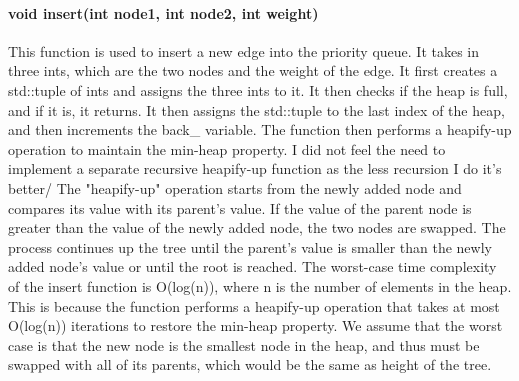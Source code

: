			\paragraph{{\color{orange}void} {\color{draculapurple}insert}({\color{orange}int} node1, {\color{orange}int} node2, {\color{orange}int} weight)}
				This function is used to insert a new edge into the priority queue. It takes in three {\color{orange}int}s, 
				which are the two nodes and the weight of the edge. It first creates a {\color{draculapurple}std::tuple} of 
				{\color{draculapurple}int}s and assigns the three {\color{orange}int}s to it. It then checks if the heap is full, 
				and if it is, it returns. It then assigns the {\color{draculapurple}std::tuple} to the last index of the heap, 
				and then increments the {\color{Turquoise}back\_} variable.
				The function then performs a {\color{draculapurple}heapify-up} operation to maintain the min-heap property. I did not feel the need to implement a separate recursive heapify-up function as the less recursion I do it's better/
				The "{\color{draculapurple}heapify-up}" operation starts from the newly added node and compares its value with its parent's value. 
				If the value of the parent node is greater than the value of the newly added node, the two nodes are swapped.
				The process continues up the tree until the parent's value is smaller than the newly added node's value or until the root is reached.
				The worst-case time complexity of the {\color{draculapurple}insert} function is {\color{lightblue}O(log(n))}, where n is the number of elements in the heap.
				This is because the function performs a {\color{draculapurple}heapify-up} operation that takes at most {\color{lightblue}O(log(n))} 
				iterations to restore the min-heap property. We assume that the worst case is that the new node is the smallest node in the heap, and 
				thus must be swapped with all of its parents, which would be the same as height of the tree.

